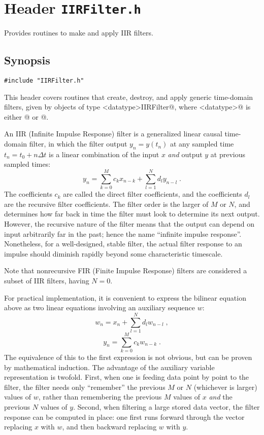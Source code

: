 
\section{Header \texttt{IIRFilter.h}}

Provides routines to make and apply IIR filters.

\subsection{Synopsis}
\begin{verbatim}
#include "IIRFilter.h"
\end{verbatim}

\noindent This header covers routines that create, destroy, and apply
generic time-domain filters, given by objects of type
\verb@<datatype>IIRFilter@, where \verb@<datatype>@ is either
@ or @.

An IIR (Infinite Impulse Response) filter is a generalized linear
causal time-domain filter, in which the filter output $y_n=y(t_n)$ at
any sampled time $t_n=t_0+n\Delta t$ is a linear combination of the
input $x$ \emph{and} output $y$ at previous sampled times:
$$
y_n = \sum_{k=0}^M c_k x_{n-k} + \sum_{l=1}^N d_l y_{n-l} \; .
$$
The coefficients $c_k$ are called the direct filter coefficients, and
the coefficients $d_l$ are the recursive filter coefficients.  The
filter order is the larger of $M$ or $N$, and determines how far back
in time the filter must look to determine its next output.  However,
the recursive nature of the filter means that the output can depend on
input arbitrarily far in the past; hence the name ``infinite impulse
response''.  Nonetheless, for a well-designed, stable filter, the
actual filter response to an impulse should diminish rapidly beyond
some characteristic timescale.

Note that nonrecursive FIR (Finite Impulse Response) filters are
considered a subset of IIR filters, having $N=0$.

For practical implementation, it is convenient to express the bilinear
equation above as two linear equations involving an auxiliary sequence
$w$:
$$
w_n = x_n + \sum_{l=1}^N d_l w_{n-l} \; ,
$$
$$
y_n = \sum_{k=0}^M c_k w_{n-k} \; .
$$
The equivalence of this to the first expression is not obvious, but
can be proven by mathematical induction.  The advantage of the
auxiliary variable representation is twofold.  First, when one is
feeding data point by point to the filter, the filter needs only
``remember'' the previous $M$ or $N$ (whichever is larger) values of
$w$, rather than remembering the previous $M$ values of $x$ \emph{and}
the previous $N$ values of $y$.  Second, when filtering a large stored
data vector, the filter response can be computed in place: one first
runs forward through the vector replacing $x$ with $w$, and then
backward replacing $w$ with $y$.

